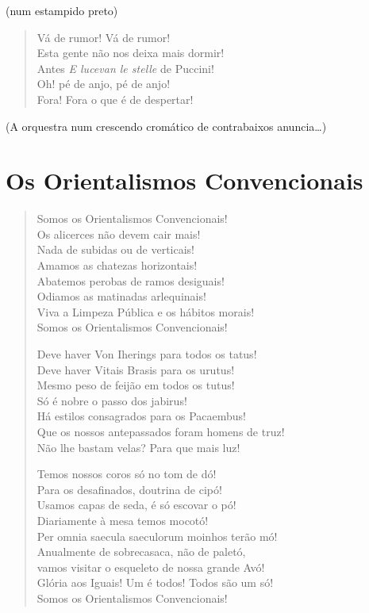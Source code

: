 \hfill{}{\small(num estampido preto)}

\begin{verse}
Vá de rumor! Vá de rumor!\\
Esta gente não nos deixa mais dormir!\\
Antes \emph{E lucevan le stelle} de Puccini!\\
Oh! pé de anjo, pé de anjo!\\
Fora! Fora o que é de despertar!
\end{verse}

\hfill{}{\small(A orquestra num crescendo cromático de contrabaixos anuncia\ldots{})}

\medskip
\section*{Os Orientalismos Convencionais}

\begin{verse}
Somos os Orientalismos Convencionais!\\
Os alicerces não devem cair mais!\\
Nada de subidas ou de verticais!\\
Amamos as chatezas horizontais!\\
Abatemos perobas de ramos desiguais!\\
Odiamos as matinadas arlequinais!\\
Viva a Limpeza Pública e os hábitos morais!\\
Somos os Orientalismos Convencionais!

Deve haver Von Iherings para todos os tatus!\\
Deve haver Vitais Brasis para os urutus!\\
Mesmo peso de feijão em todos os tutus!\\
Só é nobre o passo dos jabirus!\\
Há estilos consagrados para os Pacaembus!\\
Que os nossos antepassados foram homens de truz!\\
Não lhe bastam velas? Para que mais luz!

Temos nossos coros só no tom de dó!\\
Para os desafinados, doutrina de cipó!\\
Usamos capas de seda, é só escovar o pó!\\
Diariamente à mesa temos mocotó!\\
Per omnia saecula saeculorum moinhos terão mó!\\
Anualmente de sobrecasaca, não de paletó,\\
vamos visitar o esqueleto de nossa grande Avó!\\
Glória aos Iguais! Um é todos! Todos são um só!\\
Somos os Orientalismos Convencionais!
\end{verse}

